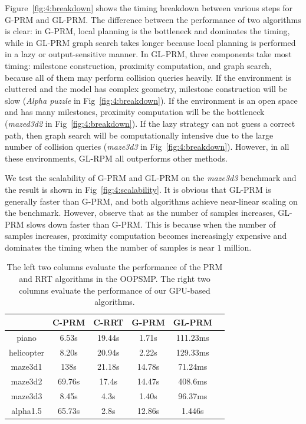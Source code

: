 Figure~\ref{fig:4:breakdown} shows the timing breakdown between various steps for G-PRM and GL-PRM. The difference between the performance of two algorithms is clear: in G-PRM, local planning is the bottleneck and dominates the timing, while in GL-PRM graph search takes longer because local planning is performed in a lazy or output-sensitive manner. In GL-PRM, three components take most timing: milestone construction, proximity computation, and graph search, because all of them may perform collision queries heavily. If the environment is cluttered and the model has complex geometry, milestone construction will be slow (\emph{Alpha puzzle} in Fig~\ref{fig:4:breakdown}). If the environment is an open space and has many milestones, proximity computation will be the bottleneck (\emph{mazed3d2} in Fig~\ref{fig:4:breakdown}). If the lazy strategy can not guess a correct path, then graph search will be computationally intensive due to the large number of collision queries (\emph{maze3d3} in Fig~\ref{fig:4:breakdown}). However, in all these environments, GL-RPM all outperforms other methods.

We test the scalability of G-PRM and GL-PRM on the \emph{maze3d3} benchmark and the result is shown in Fig~\ref{fig:4:scalability}. It is obvious that GL-PRM is generally faster than G-PRM, and both algorithms achieve near-linear scaling on the benchmark. However, observe that as the number of samples increases, GL-PRM slows down faster than G-PRM. This is because when the number of samples increases, proximity computation becomes increasingly expensive and dominates the timing when the number of samples is near $1$ million.

\begin{table}[htb]
\begin{center}
\begin{small}
\begin{tabular}{|c|c|c|c|c|c|} \hline
               & C-PRM & C-RRT & G-PRM & GL-PRM \\ \hline \hline
piano          & 6.53s   &  19.44s &   1.71s   &     111.23ms      \\  \hline
helicopter          & 8.20s     &  20.94s    &  2.22s    &  129.33ms      \\ \hline
maze3d1        & 138s  &  21.18s    &     14.78s &     71.24ms    \\ \hline
maze3d2        & 69.76s &  17.4s   &   14.47s   &      408.6ms   \\ \hline
maze3d3        & 8.45s   &   4.3s   &  1.40s    &     96.37ms    \\ \hline
alpha1.5       & 65.73s  &   2.8s   &    12.86s  &   1.446s      \\ \hline
\end{tabular}
\end{small}
\end{center}
\caption[Performance comparison between the PRM and RRT implementations in OOPSMP and the GPU-based planner]{The left two columns evaluate the performance of the PRM and RRT algorithms in the OOPSMP. The right two columns evaluate the performance of our GPU-based algorithms.}\label{tab:4:complexity}
\end{table}

